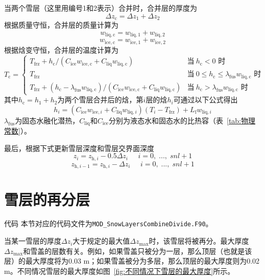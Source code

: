 当两个雪层（这里用编号1和2表示）合并时，合并层的厚度为
\begin{equation}\label{eq:SnowCombThick}
  \Delta {z}_{\mathrm {c}} =\Delta {z}_{1}+\Delta {z}_{2}
\end{equation}
根据质量守恒，合并层的质量计算为
\begin{equation}
  w_{\mathrm{liq,c}}=w_{\mathrm{liq,1}}+w_{\mathrm{liq,2}}
\end{equation}
\begin{equation}
  w_{\mathrm{ice,c}}=w_{\mathrm{ice,1}}+w_{\mathrm{ice,2}}
\end{equation}
根据焓变守恒，合并层的温度计算为
\begin{equation}\label{eq:SnowCombTemp}
  T_{\mathrm {c}} =\begin{cases}
    T_{\mathrm {frz}} +{h_{\mathrm {c}} }/\left(C_{\mathrm{ice}}w_{\mathrm{ice,c}}+C_{\mathrm{liq}}w_{\mathrm{liq,c}}\right) &\text{当}\ h_{\mathrm {c}} <0 \text{ 时} \\
    T_{\mathrm {frz}}  &\text{当}\ 0 \leqslant h_{\mathrm {c}}  \leqslant \lambda_{\mathrm {fus}}  w_{\mathrm{liq,c}} \text{ 时}\\
    T_{\mathrm {frz}} +\left(h_{\mathrm {c}} -\lambda_{\mathrm {fus}}  w_{\mathrm{liq,c}}\right)/\left(C_{\mathrm{ice}} w_{\mathrm{ice,c}}+C_{\mathrm{liq}} w_{\mathrm{liq,c}}\right) &\text{当}\ h_{\mathrm {c}}  > \lambda_{\mathrm {fus}}  w_{\mathrm{liq,c}} \text{ 时}
  \end{cases}
\end{equation}
其中$h_{\mathrm {c}} =h_1+h_2$为两个雪层合并后的焓，第$i$层的焓$h_i$可通过以下公式得出
\begin{equation}
  h_i=\left(C_{\mathrm{ice}}w_{\mathrm{ice},i}+C_{\mathrm{liq}}w_{\mathrm{liq},i}\right)\left(T_i-T_{\mathrm {frz}} \right)+L_{\mathrm f}w_{\mathrm{liq},i}
\end{equation}
$\lambda_{\mathrm {fus}} $为固态水融化潜热，$C_{\mathrm{liq}}$和$C_{\mathrm{ice}}$分别为液态水和固态水的比热容（表~\ref{tab:物理常数}）。

最后，根据下式更新雪层深度和雪层交界面深度
\begin{equation}
  z_i=z_{\mathrm{h},i}-0.5\Delta z_i \;\;\;\;\;i=0,\;...,\;snl+1
\end{equation}
\begin{equation}
  z_{\mathrm{h},i-1}=z_{\mathrm{h},i}-\Delta z_i \;\;\;\;\;i=0,\;...,\;snl+1
\end{equation}



\section{雪层的再分层}\label{雪层的再分层}
\begin{mymdframed}{代码}
  本节对应的代码文件为\texttt{MOD\_SnowLayersCombineDivide.F90}。
\end{mymdframed}
当某一雪层的厚度$\Delta z_i$大于规定的最大值$\Delta z_{\mathrm{max}}$时，该雪层将被再分。最大厚度$\Delta z_{\mathrm{max}}$和雪盖的层数有关。例如，如果雪盖只被分为一层，那么顶层（也就是该层）的最大厚度将为0.03 \unit{m}；如果雪盖被分为多层，那么顶层的最大厚度则为0.02 \unit{m}。不同情况雪层的最大厚度如图~\ref{fig:不同情况下雪层的最大厚度}所示。

